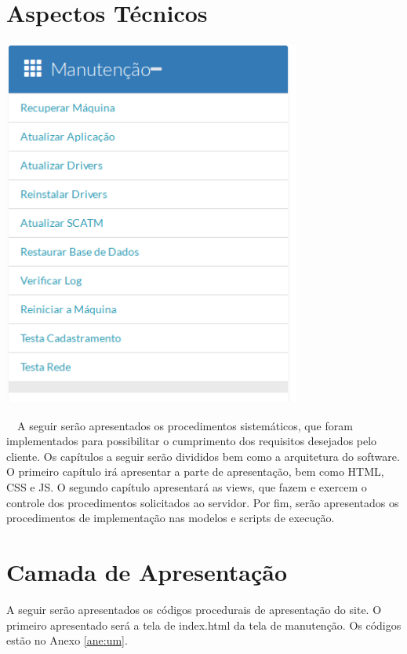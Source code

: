         \bigskip

        \section[Aspectos T\'ecnicos]{Aspectos T\'ecnicos}
        \begin{center}
        \includegraphics[width=9.793cm,height=12.143cm]{figuras/RATCETECATMSTFLS051718v2-img009.png}
        \end{center}
{\color{black}
    \ \ A seguir ser\~ao apresentados os procedimentos sistem\'aticos, que foram implementados para possibilitar o
        cumprimento dos requisitos desejados pelo cliente. Os cap\'itulos a seguir ser\~ao divididos bem como a arquitetura do
        software. O primeiro cap\'itulo ir\'a apresentar a parte de apresenta\c{c}\~ao, bem como HTML, CSS e JS. O segundo
        cap\'itulo apresentar\'a as views, que fazem e exercem o controle dos procedimentos solicitados ao servidor. Por fim,
        ser\~ao apresentados os procedimentos de implementa\c{c}\~ao nas modelos e scripts de execu\c{c}\~ao. }


        \section[Camada de Apresenta\c{c}\~ao]{Camada de Apresenta\c{c}\~ao}
{\color{black}
    A seguir ser\~ao apresentados os c\'odigos procedurais de apresenta\c{c}\~ao do site. O primeiro apresentado ser\'a a
        tela de index.html da tela de manuten\c{c}\~ao.} Os códigos estão no Anexo \ref{ane:um}.


